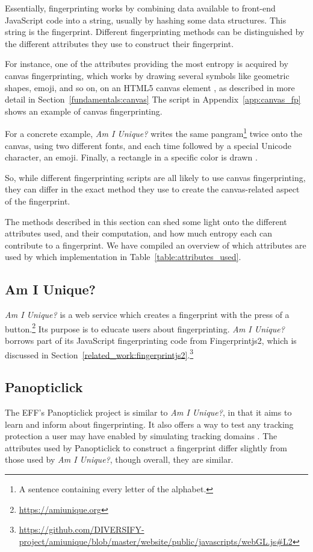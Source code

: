 \documentclass[
    fontsize=12pt,
    headings=small,
    parskip=half,
    bibliography=totoc,
    numbers=noenddot,
    open=any
    ]{scrreprt}
\begin{document}
Essentially, fingerprinting works by combining data available to front-end JavaScript code into a string,
usually by hashing some data structures. This string is the fingerprint.
Different fingerprinting methods can be distinguished by the different attributes they use to construct their fingerprint.

For instance, one of the attributes providing the most entropy is acquired by canvas fingerprinting, which works by drawing
several symbols like geometric shapes, emoji, and so on, on an HTML5 canvas element \cite{laperdrix2016beauty},
as described in more detail in Section~\ref{fundamentals:canvas}
The script in Appendix~\ref{app:canvas_fp} shows an example of canvas fingerprinting.

For a concrete example, \textit{Am I Unique?} writes the same pangram\footnote{A sentence containing every letter of the alphabet.}
twice onto the canvas, using two different fonts, and each time followed by a special Unicode character, an emoji.
Finally, a rectangle in a specific color is drawn \cite{laperdrix2016beauty}.

So, while different fingerprinting scripts are all likely to use canvas fingerprinting, they can differ in the exact
method they use to create the canvas-related aspect of the fingerprint.

The methods described in this section can shed some light onto the different attributes used, and their computation,
and how much entropy each can contribute to a fingerprint.
We have compiled an overview of which attributes are used by which implementation in Table~\ref{table:attributes_used}.


\subsection{Am I Unique?}
\label{related_work:am_i_unique}
\textit{Am I Unique?} \cite{laperdrix2016beauty} is a web service which creates
a fingerprint with the press of a button.\footnote{\url{https://amiunique.org}}
Its purpose is to educate users about fingerprinting.
\textit{Am I Unique?} borrows part of its JavaScript fingerprinting code from
Fingerprintjs2, which is discussed in Section~\ref{related_work:fingerprintjs2}.\footnote{\url{https://github.com/DIVERSIFY-project/amiunique/blob/master/website/public/javascripts/webGL.js\#L2}}


\subsection{Panopticlick}
\label{related_work:panopticlick}
The EFF's Panopticlick project is similar to \textit{Am I Unique?}, in that it aims to learn and inform about
fingerprinting. It also offers a way to test any tracking protection a user may have enabled by simulating
tracking domains \cite{panopticlick}. The attributes used by Panopticlick to construct a fingerprint differ slightly from those used by
\textit{Am I Unique?}, though overall, they are similar.
\end{document}
